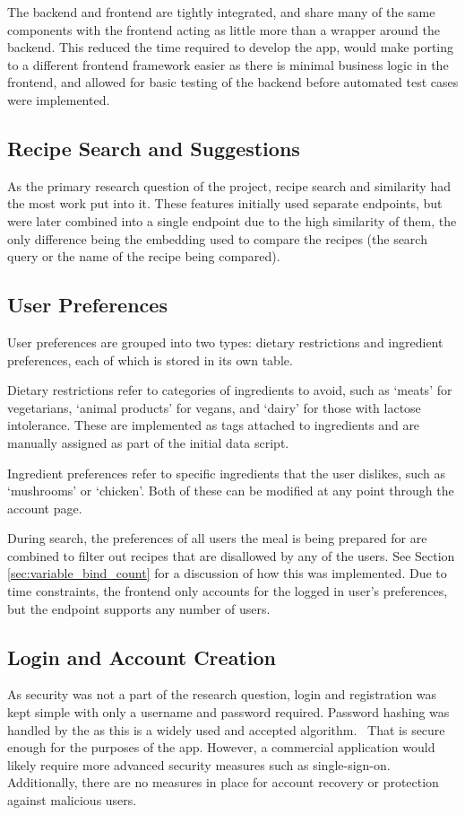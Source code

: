 The backend and frontend are tightly integrated, and share many of the same components with the frontend acting
as little more than a wrapper around the backend. This reduced the time required to develop the app, would
make porting to a different frontend framework easier as there is minimal business logic in the frontend, and
allowed for basic testing of the backend before automated test cases were implemented.

\subsection{Recipe Search and Suggestions}
As the primary research question of the project, recipe search and similarity had the most work put into it.
These features initially used separate endpoints, but were later combined into a single endpoint due to the
high similarity of them, the only difference being the embedding used to compare the recipes (the search query
or the name of the recipe being compared).

\subsection{User Preferences}
User preferences are grouped into two types: dietary restrictions and ingredient preferences, each of which is stored
in its own table.

Dietary restrictions refer to categories of ingredients to avoid, such as \enquote*{meats} for vegetarians,
\enquote*{animal products} for vegans, and \enquote*{dairy} for those with lactose intolerance. These are implemented
as tags attached to ingredients and are manually assigned as part of the initial data script.

Ingredient preferences refer to specific ingredients that the user dislikes, such as \enquote*{mushrooms} or
\enquote*{chicken}. Both of these can be modified at any point through the account page.

During search, the preferences of all users the meal is being prepared for are combined to filter out recipes
that are disallowed by any of the users. See Section \ref{sec:variable_bind_count} for a discussion of how this was implemented.
Due to time constraints, the frontend only accounts for the logged in user's preferences, but the endpoint
supports any number of users.

\subsection{Login and Account Creation}
As security was not a part of the research question, login and registration was kept simple with only a username
and password required. Password hashing was handled by the  as this is a widely used and
accepted algorithm.~\cite{ntantogian_evaluation_2019} That is secure enough for the purposes of the app. However,
a commercial application would likely require more advanced security measures such as single-sign-on. Additionally,
there are no measures in place for account recovery or protection against malicious users.

